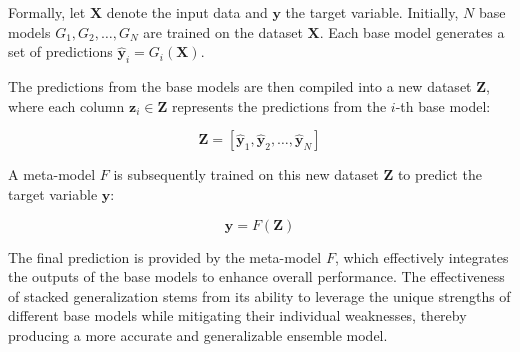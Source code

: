 Formally, let $\mathbf{X}$ denote the input data and $\mathbf{y}$ the target variable.
Initially, $N$ base models $G_1, G_2, \ldots, G_N$ are trained on the dataset $\mathbf{X}$.
Each base model generates a set of predictions $\hat{\mathbf{y}}_i = G_i(\mathbf{X})$.

The predictions from the base models are then compiled into a new dataset $\mathbf{Z}$, where each column $\mathbf{z}_i \in \mathbf{Z}$ represents the predictions from the $i$-th base model:

$$
\mathbf{Z} = [\hat{\mathbf{y}}_1, \hat{\mathbf{y}}_2, \ldots, \hat{\mathbf{y}}_N]
$$

A meta-model $F$ is subsequently trained on this new dataset $\mathbf{Z}$ to predict the target variable $\mathbf{y}$:

$$
\mathbf{\hat{y}} = F(\mathbf{Z})
$$

The final prediction is provided by the meta-model $F$, which effectively integrates the outputs of the base models to enhance overall performance.
The effectiveness of stacked generalization stems from its ability to leverage the unique strengths of different base models while mitigating their individual weaknesses, thereby producing a more accurate and generalizable ensemble model.